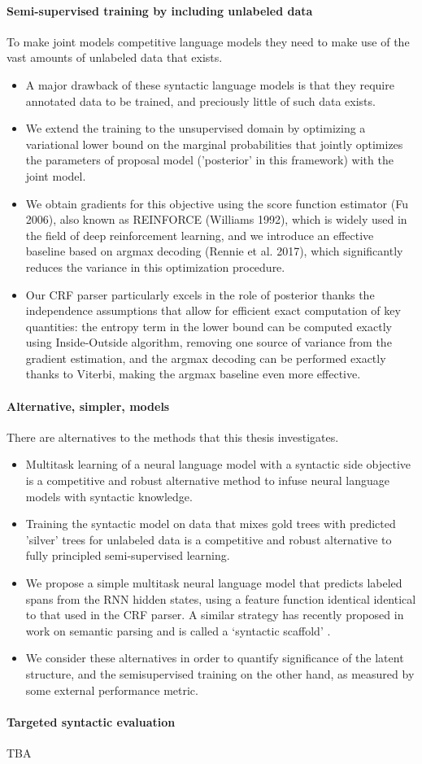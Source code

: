 \paragraph{Semi-supervised training by including unlabeled data} To make joint models competitive language models they need to make use of the vast amounts of unlabeled data that exists.
\begin{itemize}
  \item A major drawback of these syntactic language models is that they require annotated data to be trained, and preciously little of such data exists.
  \item We extend the training to the unsupervised domain by optimizing a variational lower bound on the marginal probabilities that jointly optimizes the parameters of proposal model ('posterior' in this framework) with the joint model.
  \item We obtain gradients for this objective using the score function estimator (Fu 2006), also known as REINFORCE (Williams 1992), which is widely used in the field of deep reinforcement learning, and we introduce an effective baseline based on argmax decoding (Rennie et al. 2017), which significantly reduces the variance in this optimization procedure.
  \item Our CRF parser particularly excels in the role of posterior thanks the independence assumptions that allow for efficient exact computation of key quantities: the entropy term in the lower bound can be computed exactly using Inside-Outside algorithm, removing one source of variance from the gradient estimation, and the argmax decoding can be performed exactly thanks to Viterbi, making the argmax baseline even more effective.
\end{itemize}

\paragraph{Alternative, simpler, models} There are alternatives to the methods that this thesis investigates.
\begin{itemize}
  \item Multitask learning of a neural language model with a syntactic side objective is a competitive and robust alternative method to infuse neural language models with syntactic knowledge.
  \item Training the syntactic model on data that mixes gold trees with predicted 'silver' trees for unlabeled data is a competitive and robust alternative to fully principled semi-supervised learning.
  \item We propose a simple multitask neural language model that predicts labeled spans from the RNN hidden states, using a feature function identical identical to that used in the CRF parser. A similar strategy has recently proposed in work on semantic parsing and is called a `syntactic scaffold' \citep{Swayamdipta+2018:scaffold}.
  \item We consider these alternatives in order to quantify significance of the latent structure, and the semisupervised training on the other hand, as measured by some external performance metric.
\end{itemize}

\paragraph{Targeted syntactic evaluation}
TBA
